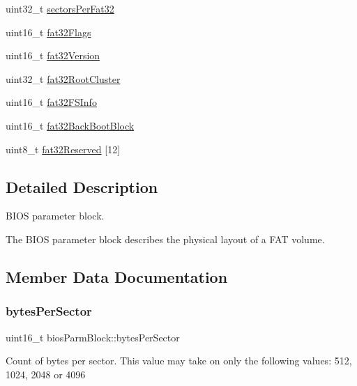 \begin{DoxyCompactItemize}
uint32\+\_\+t \hyperlink{structbios_parm_block_ad80429df03a6b80f79b18cb6e1008d64}{sectors\+Per\+Fat32}
\item 
uint16\+\_\+t \hyperlink{structbios_parm_block_a626ac3dc473d764688b8171916eecf44}{fat32\+Flags}
\item 
uint16\+\_\+t \hyperlink{structbios_parm_block_abad4f6f0c14dad9f5b7d43de94e685e8}{fat32\+Version}
\item 
uint32\+\_\+t \hyperlink{structbios_parm_block_a77ca01bd99f746e05dd872cbd2979937}{fat32\+Root\+Cluster}
\item 
uint16\+\_\+t \hyperlink{structbios_parm_block_a25ea392d8284e6c1d007cb8fcad4b86c}{fat32\+F\+S\+Info}
\item 
uint16\+\_\+t \hyperlink{structbios_parm_block_a7a4e93790b6e66f090c1551020b099bd}{fat32\+Back\+Boot\+Block}
\item 
uint8\+\_\+t \hyperlink{structbios_parm_block_a351f87fe3446b1a71963a30bbdc23218}{fat32\+Reserved} \mbox{[}12\mbox{]}
\end{DoxyCompactItemize}


\subsection{Detailed Description}
B\+I\+OS parameter block. 

The B\+I\+OS parameter block describes the physical layout of a F\+AT volume. 

\subsection{Member Data Documentation}
\mbox{\label{structbios_parm_block_aec24d316af486445d55da14cbbfa6bf4}} 
\subsubsection{\texorpdfstring{bytes\+Per\+Sector}{bytesPerSector}}
{\footnotesize\ttfamily uint16\+\_\+t bios\+Parm\+Block\+::bytes\+Per\+Sector}

Count of bytes per sector. This value may take on only the following values\+: 512, 1024, 2048 or 4096 \mbox{\label{structbios_parm_block_a7a4e93790b6e66f090c1551020b099bd}} 
